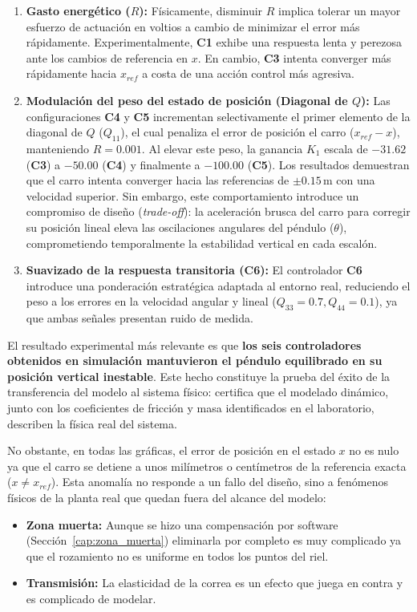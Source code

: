 \documentclass[11pt,fleqn]{book} %
\begin{document}
\begin{enumerate}
	\item \textbf{Gasto energético ($R$):} Físicamente, disminuir $R$ implica tolerar un mayor esfuerzo de actuación en voltios a cambio de minimizar el error más rápidamente. Experimentalmente, \textbf{C1} exhibe una respuesta lenta y perezosa ante los cambios de referencia en $x$. En cambio, \textbf{C3} intenta converger más rápidamente hacia $x_{ref}$ a costa de una acción control más agresiva.
	
	\item \textbf{Modulación del peso del estado de posición (Diagonal de $Q$):} Las configuraciones \textbf{C4} y \textbf{C5} incrementan selectivamente el primer elemento de la diagonal de $Q$ ($Q_{11}$), el cual penaliza el error de posición el carro ($x_{ref} - x$), manteniendo $R=0.001$. Al elevar este peso, la ganancia $K_1$ escala de $-31.62$ (\textbf{C3}) a $-50.00$ (\textbf{C4}) y finalmente a $-100.00$ (\textbf{C5}). Los resultados demuestran que el carro intenta converger hacia las referencias de $\pm 0.15\,\text{m}$ con una velocidad superior. Sin embargo, este comportamiento introduce un compromiso de diseño (\textit{trade-off}): la aceleración brusca del carro para corregir su posición lineal eleva las oscilaciones angulares del péndulo ($\theta$), comprometiendo temporalmente la estabilidad vertical en cada escalón.
	
	\item \textbf{Suavizado de la respuesta transitoria (\textbf{C6}):} El controlador \textbf{C6} introduce una ponderación estratégica adaptada al entorno real, reduciendo el peso a los errores en la velocidad angular y lineal ($Q_{33}=0.7, Q_{44}=0.1$), ya que ambas señales presentan ruido de medida. 
\end{enumerate}

El resultado experimental más relevante es que \textbf{los seis controladores obtenidos en simulación mantuvieron el péndulo equilibrado en su posición vertical inestable}. Este hecho constituye la prueba del éxito de la transferencia del modelo al sistema físico: certifica que el modelado dinámico, junto con los coeficientes de fricción y masa identificados en el laboratorio, describen la física real del sistema.

No obstante, en todas las gráficas,  el error de posición en el estado $x$ no es nulo ya que el carro se detiene a unos milímetros o centímetros de la referencia exacta ($x \ne x_{ref}$). Esta anomalía no responde a un fallo del diseño, sino a fenómenos físicos de la planta real que quedan fuera del alcance del modelo:
\begin{itemize}
	\item \textbf{Zona muerta:} Aunque se hizo una compensación por software (Sección~\ref{cap:zona_muerta}) eliminarla por completo es muy complicado ya que el rozamiento no es uniforme en todos los puntos del riel. 
	
	\item \textbf{Transmisión:} La elasticidad de la correa es un efecto que juega en contra y es complicado de modelar. 
\end{itemize}
 
\end{document}

